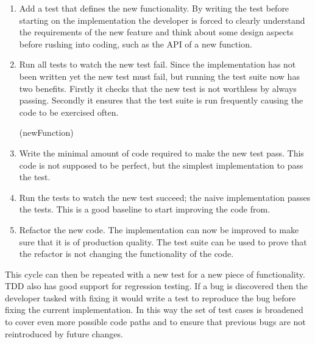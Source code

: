 \begin{enumerate}
\item Add a test that defines the new functionality. By writing the test before starting on
	the implementation the developer is forced to clearly understand the requirements of
	the new feature and think about some design aspects before rushing into coding,
	such as the API of a new function.

\item Run all tests to watch the new test fail. Since the implementation has not been written
	yet the new test must fail, but running the test suite now has two benefits. Firstly
	it checks that the new test is not worthless by always passing. Secondly it ensures
	that the test suite is run frequently causing the code to be exercised often.

\functions(newFunction)

\item Write the minimal amount of code required to make the new test pass. This code is not
	supposed to be perfect, but the simplest implementation to pass the test.

\item Run the tests to watch the new test succeed; the naive implementation passes the tests.
	This is a good baseline to start improving the code from.

\item Refactor the new code. The implementation can now be improved to make sure that it is
	of production quality. The test suite can be used to prove that the refactor is not
	changing the functionality of the code.
\end{enumerate}

This cycle can then be repeated with a new test for a new piece of functionality.
TDD also has good support for regression testing. If a bug is discovered then the developer
tasked with fixing it would write a test to reproduce the bug before fixing the current
implementation. In this way the set of test cases is broadened to cover even more
possible code paths and to ensure that previous bugs are not reintroduced by future
changes.

